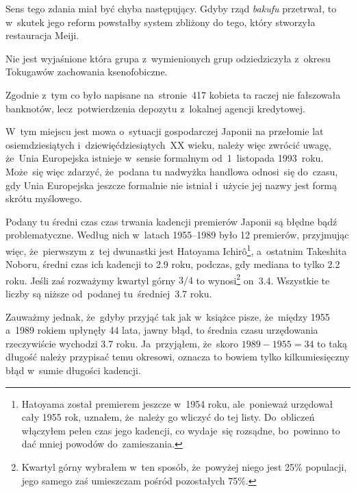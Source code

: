 \documentclass[a4paper,11pt]{article}
\numberwithin{equation}{section}
\begin{document}
\noindent
{} Sens tego zdania miał być chyba następujący. Gdyby rząd
\textit{bakufu} przetrwał, to w~skutek jego reform powstałby system
zbliżony do tego, który stworzyła restauracja Meiji.

\VerSpaceFour





\noindent
{} Nie jest wyjaśnione która grupa z~wymienionych
grup odziedziczyła z~okresu Tokugawów zachowania ksenofobiczne.

\VerSpaceFour





\noindent
{} Zgodnie z~tym co było napisane na~stronie~417
kobieta ta raczej nie fałszowała banknotów, lecz~potwierdzenia depozytu
z~lokalnej agencji kredytowej.

\VerSpaceFour





\noindent
{} W~tym miejscu jest mowa o~sytuacji gospodarczej
Japonii na przełomie lat osiemdziesiątych i~dziewięćdziesiątych~XX wieku,
należy
więc zwrócić uwagę, że~Unia Europejska istnieje w~sensie formalnym
od~1~listopada 1993~roku. Może~się więc zdarzyć, że~podana tu nadwyżka
handlowa odnosi~się do~czasu, gdy Unia Europejska jeszcze formalnie nie
istniał i~użycie jej nazwy jest formą skrótu myślowego.

\VerSpaceFour





\noindent
{} Podany tu średni czas czas trwania kadencji premierów Japonii
są błędne bądź problematyczne. Według nich w~latach 1955--1989
było 12 premierów, przyjmując więc, że~pierwszym z~tej dwunastki jest
Hatoyama Ichir\^{o}\footnote{Hatoyama został premierem jeszcze w~1954
  roku, ale~ponieważ urzędował cały 1955 rok, uznałem, że~należy go
  wliczyć do tej listy. Do~obliczeń włączyłem pełen czas jego
  kadencji, co wydaje~się rozsądne, bo~powinno to dać mniej powodów
  do~zamieszania.}, a~ostatnim Takeshita Noboru, średni czas ich
kadencji to 2.9 roku, podczas, gdy mediana to tylko 2.2 roku. Jeśli
zaś rozważymy kwartyl górny $3 / 4$ to wynosi\footnote{Kwartyl górny
  wybrałem w~ten sposób, że~powyżej niego jest 25\% populacji, jego
  samego zaś umieszczam pośród pozostałych 75\%.} on~3.4. Wszystkie te
liczby są niższe od~podanej tu~średniej~3.7 roku.

Zauważmy jednak, że~gdyby przyjąć tak jak w~książce pisze, że~między
1955 a~1989 rokiem upłynęły 44 lata, jawny błąd, to średnia czasu
urzędowania rzeczywiście wychodzi 3.7 roku. Ja~przyjąłem, że~skoro
$1989 - 1955 = 34$ to taką długość należy przypisać temu okresowi,
oznacza to bowiem tylko kilkumiesięczny błąd w~sumie długości
kadencji.
\end{document}
